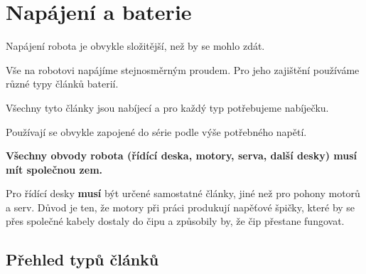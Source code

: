 \section{Napájení a baterie}


 Napájení robota je obvykle složitější, než by se mohlo zdát. 

Vše na robotovi napájíme stejnosměrným proudem. Pro jeho zajištění používáme různé typy článků baterií.

Všechny tyto články jsou nabíjecí a pro každý typ potřebujeme nabíječku.

Používají se obvykle zapojené do série podle výše potřebného napětí. 


{\bf  Všechny obvody robota (řídící deska, motory, serva, další desky) musí mít společnou zem. }  


Pro řídící desky {\bf musí}  být určené samostatné články, jiné než pro pohony motorů a serv. Důvod je ten, že motory při práci produkují napěťové špičky, které by se přes společné kabely dostaly do čipu a způsobily by, že čip přestane fungovat.  


\subsection{Přehled typů článků}

